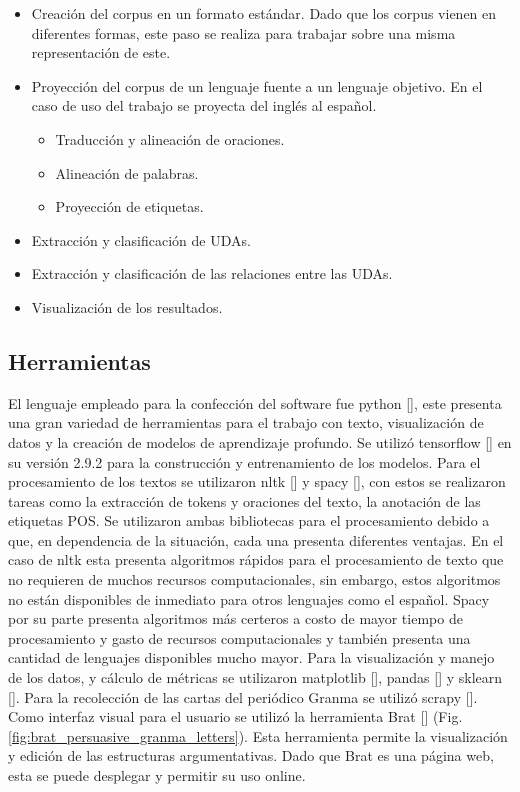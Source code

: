 \begin{itemize}
    \item Creación del corpus en un formato estándar. Dado que los corpus vienen en diferentes 
	formas, este paso se realiza para trabajar sobre una misma representación de este.
    \item Proyección del corpus de un lenguaje fuente a un lenguaje objetivo. En el caso de 
	uso del trabajo se proyecta del inglés al español.
    \begin{itemize}
        \item Traducción y alineación de oraciones.
        \item Alineación de palabras.
        \item Proyección de etiquetas.
    \end{itemize}
    \item Extracción y clasificación de UDAs.
    \item Extracción y clasificación de las relaciones entre las UDAs.
    \item Visualización de los resultados.
\end{itemize}

\subsection{Herramientas}

El lenguaje empleado para la confección del software fue python [\cite{python}], este presenta 
una gran variedad de herramientas 
para el trabajo con texto, visualización de datos y la creación de modelos de aprendizaje profundo.
Se utilizó tensorflow [\cite{tensorflow}] en su versión 2.9.2 para la construcción y entrenamiento de los modelos. 
Para el procesamiento de los textos se utilizaron nltk [\cite{nltk}] y spacy [\cite{spacy}], con estos se realizaron tareas
como la extracción de tokens y oraciones del texto, la anotación de las etiquetas POS. Se utilizaron 
ambas bibliotecas para el procesamiento debido a que, en dependencia de la situación, cada una presenta diferentes
ventajas. En el caso de nltk esta presenta algoritmos rápidos para el procesamiento de texto que no 
requieren de muchos recursos computacionales, sin embargo, estos algoritmos no están disponibles de inmediato
para otros lenguajes como el español. Spacy por su parte presenta algoritmos más certeros a costo 
de mayor tiempo de procesamiento y gasto de recursos computacionales y también presenta una cantidad de lenguajes 
disponibles mucho mayor. Para la visualización y manejo de los datos, y cálculo de métricas se utilizaron 
matplotlib [\cite{matplotlib}], pandas [\cite{pandas}] y sklearn [\cite{sklearn}]. 
Para la recolección de las cartas del periódico Granma se utilizó scrapy [\cite{scrapy}].
Como interfaz visual para el usuario se utilizó la herramienta Brat [\cite{brat}] 
(Fig. \ref{fig:brat_persuasive_granma_letters}). Esta herramienta permite
la visualización y edición de las estructuras argumentativas. Dado que Brat es una página web, esta se puede
desplegar y permitir su uso online.

